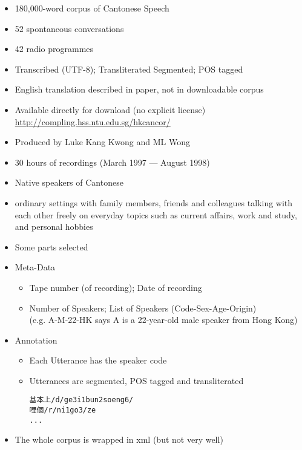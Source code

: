 \documentclass[a4paper,landscape,headrule,footrule,xetex]{foils}
\begin{document}


\begin{itemize}
\item 180,000-word corpus of Cantonese Speech
\item 52 spontaneous conversations
\item 42 radio programmes
\item Transcribed (UTF-8); Transliterated Segmented; POS tagged
\item English translation described in paper, not in downloadable corpus
\item Available directly for download (no explicit license)
\\ \url{http://compling.hss.ntu.edu.sg/hkcancor/}
\item Produced by Luke Kang Kwong and ML Wong
\end{itemize}
\begin{itemize}
\item 30 hours of recordings (March 1997 --- August 1998)
\item Native speakers of Cantonese
\item ordinary settings with family members, friends and colleagues talking with each other freely on everyday topics such as current affairs, work and study, and personal hobbies
\item Some parts selected
\end{itemize}

\begin{itemize}
\item Meta-Data
  \begin{itemize}
  \item Tape number (of recording);  Date of recording
  \item Number of Speakers; List of Speakers (Code-Sex-Age-Origin) \\
(e.g. A-M-22-HK says A is a 22-year-old male speaker from Hong Kong)
  \end{itemize}
\item Annotation
  \begin{itemize}
  \item Each Utterance has the speaker code
  \item Utterances are segmented, POS tagged and transliterated
    \begin{verbatim}
基本上/d/ge3i1bun2soeng6/
哩個/r/ni1go3/ze
...
\end{verbatim}
  \end{itemize}
\item The whole corpus is wrapped in xml (but not very well)
\end{itemize}
\end{document}
